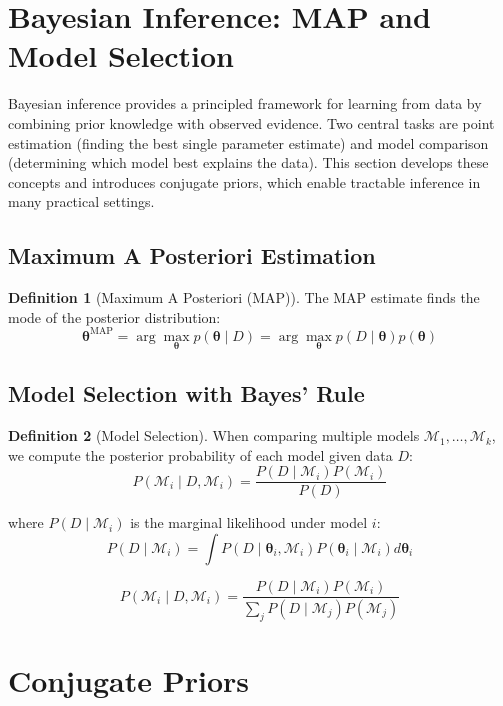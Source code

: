 \documentclass[12pt,a4paper]{article}
\theoremstyle{definition}
\newtheorem{definition}{Definition}[section]
\begin{document}
\section{Bayesian Inference: MAP and Model Selection}

Bayesian inference provides a principled framework for learning from data by combining prior knowledge with observed evidence. Two central tasks are point estimation (finding the best single parameter estimate) and model comparison (determining which model best explains the data). This section develops these concepts and introduces conjugate priors, which enable tractable inference in many practical settings.

\subsection{Maximum A Posteriori Estimation}

\begin{definition}[Maximum A Posteriori (MAP)]
The MAP estimate finds the mode of the posterior distribution:
\[
\boldsymbol{\theta}^{\text{MAP}} = \arg\max_{\boldsymbol{\theta}} p(\boldsymbol{\theta} \mid D) = \arg\max_{\boldsymbol{\theta}} p(D \mid \boldsymbol{\theta}) p(\boldsymbol{\theta})
\]
\end{definition}

\subsection{Model Selection with Bayes' Rule}

\begin{definition}[Model Selection]
When comparing multiple models $\mathcal{M}_1, \ldots, \mathcal{M}_k$, we compute the posterior probability of each model given data $D$:
\[
P(\mathcal{M}_i \mid D, \mathcal{M}_i) = \frac{P(D \mid \mathcal{M}_i) P(\mathcal{M}_i)}{P(D)}
\]

where $P(D \mid \mathcal{M}_i)$ is the marginal likelihood under model $i$:
\[
P(D \mid \mathcal{M}_i) = \int P(D \mid \boldsymbol{\theta}_i, \mathcal{M}_i) P(\boldsymbol{\theta}_i \mid \mathcal{M}_i) d\boldsymbol{\theta}_i
\]
\end{definition}

\[
P(\mathcal{M}_i \mid D, \mathcal{M}_i) = \frac{P(D \mid \mathcal{M}_i) P(\mathcal{M}_i)}{\sum_j P(D \mid \mathcal{M}_j) P(\mathcal{M}_j)}
\]

\section{Conjugate Priors}
\end{document}
